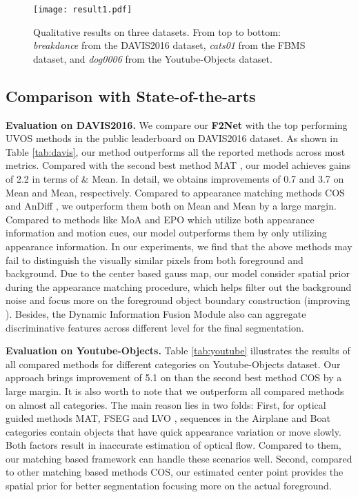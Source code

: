 \documentclass[letterpaper]{article} \usepackage{aaai20}  \usepackage{times}  \usepackage{helvet} \usepackage{courier}  \usepackage[hyphens]{url}  \usepackage{graphicx} \urlstyle{rm} \def\UrlFont{\rm}  \usepackage{graphicx}  \frenchspacing  \setlength{\pdfpagewidth}{8.5in}  \setlength{\pdfpageheight}{11in}  \usepackage{amssymb}
\begin{document}
\begin{figure*}[t!]
\centering
\texttt{[image: result1.pdf]}
\caption{Qualitative results on three datasets. From top to bottom: \textit{breakdance} from the DAVIS2016 dataset, \textit{cats01} from the
FBMS dataset, and \textit{dog0006} from the Youtube-Objects dataset.}
\label{fig:result1}
\vspace{-12pt}
\end{figure*}

\subsection{Comparison with State-of-the-arts}

\noindent \textbf{Evaluation on DAVIS2016.}
We compare our \textbf{F2Net} with the top performing UVOS methods in the public leaderboard on DAVIS2016 dataset. As shown in Table \ref{tab:davis}, our method outperforms all the reported methods across most metrics.  Compared with the second best method MAT \cite{zhou2020motion}, our model achieves gains of 2.2 in terms of \& Mean. In detail, we obtains improvements of 0.7 and 3.7 on  Mean and  Mean, respectively.
Compared to appearance matching methods COS \cite{lu2019see} and AnDiff \cite{yang2019anchor}, we outperform them both on  Mean and  Mean by a large margin.
Compared to methods like MoA \cite{siam2019video} and EPO \cite{faisal2019exploiting} which utilize both appearance information and motion cues, our model outperforms them by only utilizing appearance information.
In our experiments, we find that the above methods may fail to distinguish the visually similar pixels from both foreground and background.
Due to the center based gauss map, our model consider spatial prior during the appearance matching procedure, which helps filter out the background noise and focus more on the foreground object boundary construction (improving ). 
Besides, the Dynamic Information Fusion Module also can aggregate discriminative features across different level for the final segmentation.


\noindent \textbf{Evaluation on Youtube-Objects.}
Table \ref{tab:youtube} illustrates the results of all compared methods for different categories on Youtube-Objects dataset. Our approach brings improvement of 5.1 on  than the second best method COS \cite{lu2019see} by a large margin. It is also worth to note that we outperform all compared methods on almost all categories. The main reason lies in two folds: First, for optical guided methods MAT, FSEG \cite{jain2017fusionseg} and LVO \cite{tokmakov2017learning}, sequences in the Airplane
and Boat categories contain objects that have quick appearance variation or move slowly. Both factors result in inaccurate estimation of optical flow.
Compared to them, our matching based framework can handle
these scenarios well. Second, compared to other matching based methods COS, our estimated center point provides the spatial prior for better segmentation focusing more on the actual foreground.
\end{document}
